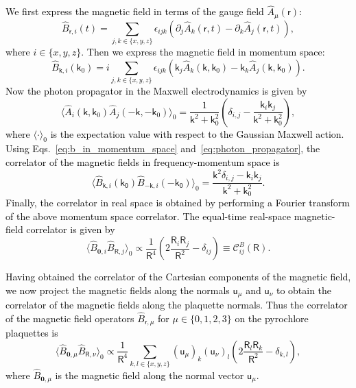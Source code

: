 \documentclass[twocolumn,superscriptaddress,amsmath,amssymb,aps,prx,nofootinbib]{revtex4-2}
\newcommand{\dual}[1]{\boldsymbol{\mathsf{#1}}}
\newcommand{\newtext}[1]{\textcolor{black}{#1}}
\begin{document}
\newtext{We first express the magnetic field in terms of the gauge field $\hat{A}_\mu(\dual{r})$:
\begin{equation}
    \hat{B}_{\dual{r}, i} (t) = \sum_{j,k \in \{x,y,z\}} \epsilon_{ijk} \left( \partial_j \hat{A}_k(\dual{r},t) - \partial_k \hat{A}_j(\dual{r},t) \right),
\end{equation}
where $i \in \{ x,y,z\}$. Then we express the magnetic field in momentum space:
\begin{equation} \label{eq:b_in_momentum_space}
    \hat{B}_{\dual{k},i} (\mathsf{k}_0) = i\sum_{j,k \in \{x,y,z\}} \epsilon_{ijk} \left( \dual{k}_j \hat{A}_k(\dual{k}, \mathsf{k}_0) - \dual{k}_k \hat{A}_j(\dual{k}, \mathsf{k}_0) \right).
\end{equation}
Now the photon propagator in the Maxwell electrodynamics is given by
\begin{equation} \label{eq:photon_propagator}
    \langle \hat{A}_i (\dual{k}, \mathsf{k}_0) \hat{A}_j (-\dual{k}, -\mathsf{k}_0) \rangle_0 = \frac{1}{\mathsf{k}^2 + \mathsf{k}_0^2} \left( \delta_{i,j} - \frac{\mathsf{k}_i \mathsf{k}_j}{\mathsf{k}^2 + \mathsf{k}_0^2} \right),
\end{equation}
where  $\langle \cdot \rangle _0$ is the expectation value with respect to the Gaussian Maxwell action. Using Eqs.~\eqref{eq:b_in_momentum_space} and~\eqref{eq:photon_propagator}, the correlator of the magnetic fields in frequency-momentum space is
\begin{equation}
    \langle \hat{B}_{\dual{k},i} (\mathsf{k_0}) \hat{B}_{-\dual{k},i} (-\mathsf{k_0}) \rangle_0 = \frac{\mathsf{k}^2 \delta_{i,j} - \dual{k}_i\dual{k}_j}{\mathsf{k}^2 + \mathsf{k}_0^2}.
\end{equation}
Finally, the correlator in real space is obtained by performing a Fourier transform of the above momentum space correlator. The equal-time real-space magnetic-field correlator is given by~\cite{hermele2004}
}
\begin{equation}\label{eq:maxwellB2B2}
  \langle \hat{B}_{\boldsymbol{0},i} \hat{B}_{\dual{R},j} \rangle_0  \propto \frac{1}{\mathsf{R}^4} \left(2 \frac{\mathsf{R}_i \mathsf{R}_j}{\mathsf{R}^2} - \delta_{ij} \right)\equiv \mathcal{C}_{ij}^{B} (\dual{R}) .
\end{equation}

\newtext{Having obtained the correlator of the Cartesian components of the magnetic field, we now project the magnetic fields along the normals $\dual{u}_\mu$ and $\dual{u}_\nu$ to obtain the correlator of the magnetic fields along the plaquette normals. 
Thus the correlator of the magnetic field operators $\hat{B}_{\dual{r},\mu}$ for $\mu \in \{ 0,1,2,3 \}$ on the pyrochlore plaquettes is
\begin{equation}
    \langle \hat{B}_{\boldsymbol{0},\mu} \hat{B}_{\dual{R},\nu} \rangle_0  \propto \frac{1}{\mathsf{R}^4} \sum_{k,l \in \{x,y,z \} } ( \dual{u}_\mu )_k ( \dual{u}_\nu )_l  \left(  2 \frac{\mathsf{R}_l \mathsf{R}_k}{\mathsf{R}^2} -  \delta_{k,l} \right),
\end{equation}
where $\hat{B}_{\boldsymbol{0},\mu}$ is the magnetic field along the normal vector $\dual{u}_\mu$. }
\end{document}
